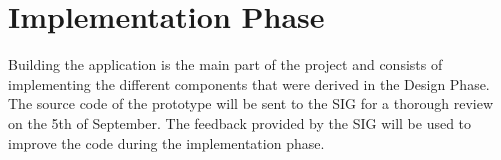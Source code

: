 \section{Implementation Phase}
\label{sec:sig}
Building the application is the main part of the project and consists of implementing the different components that were derived in the Design Phase. The source code of the prototype will be sent to the SIG for a thorough review on the 5th of September. The feedback provided by the SIG will be used to improve the code during the implementation phase.